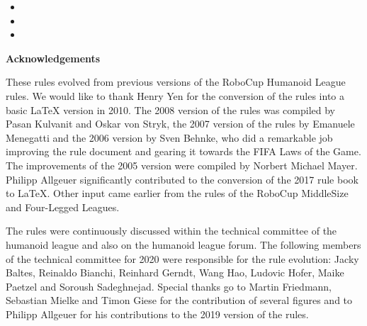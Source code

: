       \begin{itemize}
      \item {}
      \item {}
      \item {}
      \end{itemize}
      
\bigskip

{\bfseries Acknowledgements}

\headlinebox

These rules evolved from previous versions of the RoboCup Humanoid League rules. We would like to thank Henry Yen for the conversion of the rules into a basic LaTeX version in 2010. The 2008 version of the rules was compiled by Pasan Kulvanit and Oskar von Stryk, the 2007 version of the rules by Emanuele Menegatti and the 2006 version by Sven Behnke, who did a remarkable job improving the rule document and gearing it towards the FIFA Laws of the Game. The improvements of the 2005 version were compiled by Norbert Michael Mayer. Philipp Allgeuer significantly contributed to the conversion of the 2017 rule book to LaTeX.  Other input came earlier from the rules of the RoboCup MiddleSize and Four-Legged Leagues.

The rules were continuously discussed within the technical committee of the
humanoid league and also on the humanoid league forum.
The following members of the technical committee for 2020 were responsible for
the rule evolution: Jacky Baltes, Reinaldo Bianchi, Reinhard Gerndt, Wang Hao,
Ludovic Hofer, Maike Paetzel and Soroush Sadeghnejad.
Special thanks go to Martin Friedmann, Sebastian Mielke and Timon Giese for the
contribution of several figures and to Philipp Allgeuer for his contributions to
the 2019 version of the rules.
